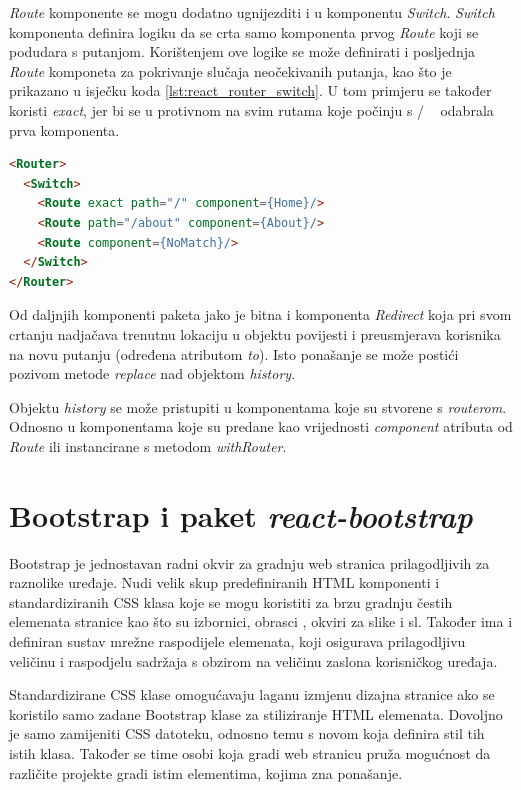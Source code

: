 \documentclass[times, utf8, zavrsni, numeric]{fer}
\newcommand{\razmakp}{\vspace{18pt}}
\newcommand{\razmaks}{\vspace{10pt}}
\begin{document}
\emph{Route} komponente se mogu dodatno ugnijezditi i u komponentu \emph{Switch}.
\emph{Switch} komponenta definira logiku da se crta samo komponenta prvog \emph{Route} koji se podudara s putanjom.
Korištenjem ove logike se može definirati i posljednja \emph{Route} komponeta za pokrivanje slučaja neočekivanih putanja, kao što je prikazano u isječku koda \ref{lst:react_router_switch}.
U tom primjeru se također koristi \emph{exact}, jer bi se u protivnom na svim rutama koje počinju s \glqq / \grqq ~ odabrala prva komponenta.

\razmakp
\begin{lstlisting}[language=html, caption={Primjer korištenja \emph{Switch}}, label={lst:react_router_switch}]
<Router>
  <Switch>
    <Route exact path="/" component={Home}/>
    <Route path="/about" component={About}/>
    <Route component={NoMatch}/>
  </Switch>
</Router>
\end{lstlisting}
\razmaks

Od daljnjih komponenti paketa jako je bitna i komponenta \emph{Redirect} koja pri svom crtanju nadjačava trenutnu lokaciju u objektu povijesti i preusmjerava korisnika na novu putanju (određena atributom \emph{to}).
Isto ponašanje se može postići pozivom metode \emph{replace} nad objektom \emph{history}.

Objektu \emph{history} se može pristupiti u komponentama koje su \glqq stvorene s \emph{routerom}\grqq .
Odnosno u komponentama koje su predane kao vrijednosti \emph{component} atributa od \emph{Route} ili instancirane s metodom \emph{withRouter}.

\newpage


\section{Bootstrap i paket \emph{react-bootstrap}}

Bootstrap je jednostavan radni okvir za gradnju web stranica prilagodljivih za raznolike uređaje.
Nudi velik skup predefiniranih HTML komponenti i standardiziranih CSS klasa koje se mogu koristiti za brzu gradnju čestih elemenata stranice kao što su izbornici, obrasci , okviri za slike i sl.
Također ima i definiran sustav mrežne raspodijele elemenata, koji osigurava prilagodljivu veličinu i raspodjelu sadržaja s obzirom na veličinu zaslona korisničkog uređaja.

Standardizirane CSS klase omogućavaju laganu izmjenu dizajna stranice ako se koristilo samo zadane Bootstrap klase za stiliziranje HTML elemenata.
Dovoljno je samo zamijeniti CSS datoteku, odnosno temu s novom koja definira stil tih istih klasa.
Također se time osobi koja gradi web stranicu pruža mogućnost da različite projekte gradi istim elementima, kojima zna ponašanje.
\end{document}
